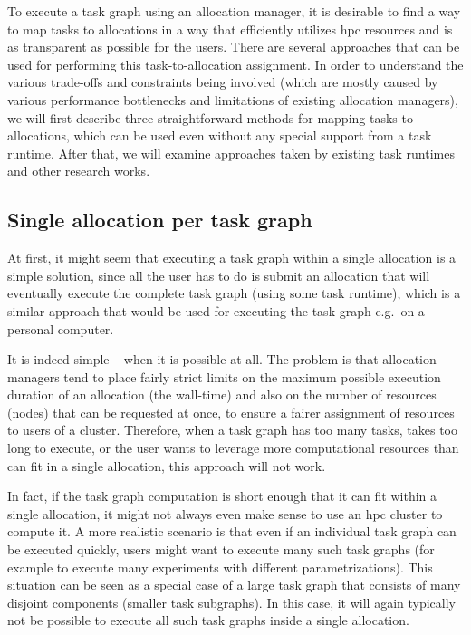 To execute a task graph using an allocation manager, it is desirable to find a way to map tasks to
allocations in a way that efficiently utilizes \gls{hpc} resources and is as
transparent as possible for the users. There are several approaches that can be used for performing
this task-to-allocation assignment. In order to understand the various trade-offs and constraints
being involved (which are mostly caused by various performance bottlenecks and limitations of
existing allocation managers), we will first describe three straightforward methods for mapping
tasks to allocations, which can be used even without any special support from a task runtime. After
that, we will examine approaches taken by existing task runtimes and other research works.

\subsection*{Single allocation per task graph}
At first, it might seem that executing a task graph within a single allocation is a simple
solution, since all the user has to do is submit an allocation that will eventually execute the
complete task graph (using some task runtime), which is a similar approach that would be used for
executing the task graph e.g.\ on a personal computer.

It is indeed simple -- when it is possible at all. The problem is that allocation managers tend to
place fairly strict limits on the maximum possible execution duration of an allocation (the
wall-time) and also on the number of resources (nodes) that can be requested at once, to ensure a
fairer assignment of resources to users of a cluster. Therefore, when a task graph has too many
tasks, takes too long to execute, or the user wants to leverage more computational resources than
can fit in a single allocation, this approach will not work.

In fact, if the task graph computation is short enough that it can fit within a single allocation,
it might not always even make sense to use an \gls{hpc} cluster to compute it. A more
realistic scenario is that even if an individual task graph can be executed quickly, users might
want to execute many such task graphs (for example to execute many experiments with different
parametrizations). This situation can be seen as a special case of a large task graph that consists
of many disjoint components (smaller task subgraphs). In this case, it will again typically not be
possible to execute all such task graphs inside a single allocation.

